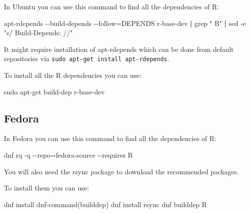 \documentclass[
  letterpaper,
  DIV=11,
  numbers=noendperiod]{scrreprt}
\newenvironment{Shaded}{\begin{snugshade}}{\end{snugshade}}
\newcommand{\AttributeTok}[1]{\textcolor[rgb]{0.40,0.45,0.13}{#1}}
\newcommand{\ExtensionTok}[1]{\textcolor[rgb]{0.00,0.23,0.31}{#1}}
\newcommand{\FunctionTok}[1]{\textcolor[rgb]{0.28,0.35,0.67}{#1}}
\newcommand{\KeywordTok}[1]{\textcolor[rgb]{0.00,0.23,0.31}{\textbf{#1}}}
\newcommand{\NormalTok}[1]{\textcolor[rgb]{0.00,0.23,0.31}{#1}}
\newcommand{\OperatorTok}[1]{\textcolor[rgb]{0.37,0.37,0.37}{#1}}
\newcommand{\StringTok}[1]{\textcolor[rgb]{0.13,0.47,0.30}{#1}}
\begin{document}
In Ubuntu you can use this command to find all the dependencies of R:

\begin{Shaded}
\begin{Highlighting}[]
\ExtensionTok{apt{-}rdepends} \AttributeTok{{-}{-}build{-}depends} \AttributeTok{{-}{-}follow}\OperatorTok{=}\NormalTok{DEPENDS r{-}base{-}dev }\KeywordTok{|} \FunctionTok{grep} \StringTok{" B"} \KeywordTok{|} \FunctionTok{sed} \AttributeTok{{-}e} \StringTok{"s/  Build{-}Depends: //"}
\end{Highlighting}
\end{Shaded}

It might require installation of apt-rdepends which can be done from
default repositories via \texttt{sudo\ apt-get\ install\ apt-rdepends}.

To install all the R dependencies you can use:

\begin{Shaded}
\begin{Highlighting}[]
\FunctionTok{sudo}\NormalTok{ apt{-}get build{-}dep r{-}base{-}dev}
\end{Highlighting}
\end{Shaded}

\subsection{Fedora}\label{fedora}

In Fedora you can use this command to find all the dependencies of R:

\begin{Shaded}
\begin{Highlighting}[]
\ExtensionTok{dnf}\NormalTok{ rq }\AttributeTok{{-}q} \AttributeTok{{-}{-}repo}\OperatorTok{=}\NormalTok{fedora{-}source }\AttributeTok{{-}{-}requires}\NormalTok{ R }
\end{Highlighting}
\end{Shaded}

You will also need the rsync package to download the recommended
packages.

To install them you can use:

\begin{Shaded}
\begin{Highlighting}[]
\ExtensionTok{dnf}\NormalTok{ install }\StringTok{\textquotesingle{}dnf{-}command(builddep)\textquotesingle{}}
\ExtensionTok{dnf}\NormalTok{ install rsync}
\ExtensionTok{dnf}\NormalTok{ builddep R}
\end{Highlighting}
\end{Shaded}
\end{document}
